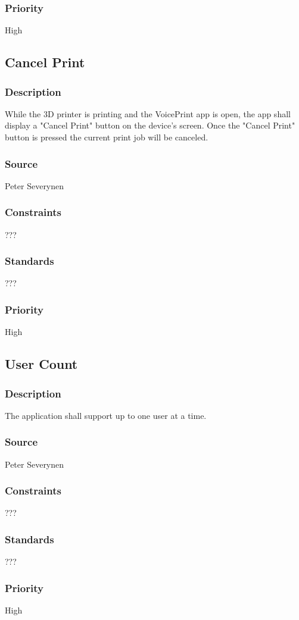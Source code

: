 \subsubsection{Priority}
High
\subsection{Cancel Print}
\subsubsection{Description}
While the 3D printer is printing and the VoicePrint app is open, the app shall display a "Cancel Print" button on the device's screen. Once the "Cancel Print" button is pressed the current print job will be canceled.
\subsubsection{Source}
Peter Severynen
\subsubsection{Constraints}
???
\subsubsection{Standards}
???
\subsubsection{Priority}
High
\subsection{User Count}
\subsubsection{Description}
The application shall support up to one user at a time.
\subsubsection{Source}
Peter Severynen
\subsubsection{Constraints}
???
\subsubsection{Standards}
???
\subsubsection{Priority}
High

